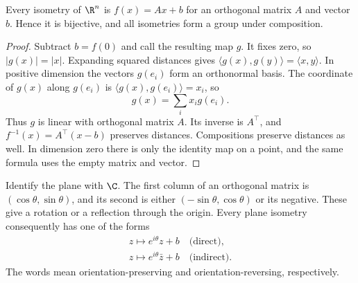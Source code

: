 \begin{theorem}\label{geometry:thm:isometryaffine}
Every isometry of $\R^n$ is $f(x)=Ax+b$ for an orthogonal matrix $A$ and vector $b$. Hence it is bijective, and all isometries form a group under composition.
\end{theorem}
\begin{proof}
Subtract $b=f(0)$ and call the resulting map $g$. It fixes zero, so $|g(x)|=|x|$. Expanding squared distances gives $\langle g(x),g(y)\rangle=\langle x,y\rangle$. In positive dimension the vectors $g(e_i)$ form an orthonormal basis. The coordinate of $g(x)$ along $g(e_i)$ is $\langle g(x),g(e_i)\rangle=x_i$, so
\[
g(x)=\sum_i x_i g(e_i).
\]
Thus $g$ is linear with orthogonal matrix $A$. Its inverse is $A^\top$, and $f^{-1}(x)=A^\top(x-b)$ preserves distances. Compositions preserve distances as well. In dimension zero there is only the identity map on a point, and the same formula uses the empty matrix and vector.
\end{proof}

Identify the plane with $\C$. The first column of an orthogonal matrix is $(\cos\theta,\sin\theta)$, and its second is either $(-\sin\theta,\cos\theta)$ or its negative. These give a rotation or a reflection through the origin. Every plane isometry consequently has one of the forms
\begin{equation}\label{geometry:eq:isomC}
\begin{gathered}
z\longmapsto e^{i\theta}z+b\quad\text{(direct)},\\
z\longmapsto e^{i\theta}\bar z+b\quad\text{(indirect)}.
\end{gathered}
\end{equation}
The words mean orientation-preserving and orientation-reversing, respectively.

